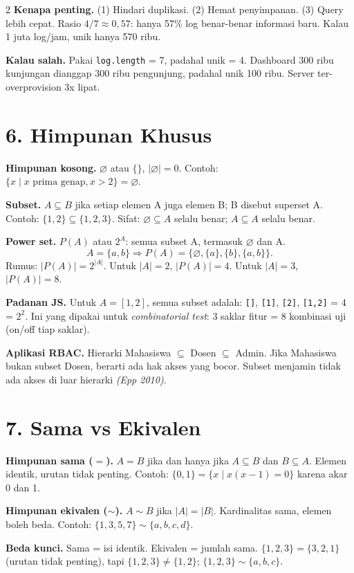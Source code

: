 \documentclass[9pt,a4paper]{extarticle}
\newcommand{\h}[1]{\textbf{#1}}
\newcommand{\src}[1]{\textit{(#1)}}
\begin{document}
\begin{multicols*}{2}
	\h{Kenapa penting.} (1) Hindari duplikasi. (2) Hemat penyimpanan. (3) Query lebih cepat. Rasio $4/7\approx0{,}57$: hanya 57\% log benar-benar informasi baru. Kalau 1 juta log/jam, unik hanya 570 ribu.

	\h{Kalau salah.} Pakai \texttt{log.length} = 7, padahal unik = 4. Dashboard 300 ribu kunjungan dianggap 300 ribu pengunjung, padahal unik 100 ribu. Server ter-overprovision 3x lipat.

	\section*{6. Himpunan Khusus}

	\h{Himpunan kosong.} $\varnothing$ atau $\{\}$, $|\varnothing|=0$. Contoh: $\{x\mid x \text{ prima genap}, x>2\}=\varnothing$.

	\h{Subset.} $A\subseteq B$ jika setiap elemen A juga elemen B; B disebut superset A. Contoh: $\{1,2\}\subseteq\{1,2,3\}$. Sifat: $\varnothing\subseteq A$ selalu benar; $A\subseteq A$ selalu benar.

	\h{Power set.} $P(A)$ atau $2^A$: semua subset A, termasuk $\varnothing$ dan A.
	$$A=\{a,b\}\Rightarrow P(A)=\{\varnothing,\{a\},\{b\},\{a,b\}\}.$$
	Rumus: $|P(A)|=2^{|A|}$. Untuk $|A|=2$, $|P(A)|=4$. Untuk $|A|=3$, $|P(A)|=8$.

	\h{Padanan JS.} Untuk $A=[1,2]$, semua subset adalah: \texttt{[]}, \texttt{[1]}, \texttt{[2]}, \texttt{[1,2]} = 4 = $2^2$. Ini yang dipakai untuk \textit{combinatorial test}: 3 saklar fitur = 8 kombinasi uji (on/off tiap saklar).

	\h{Aplikasi RBAC.} Hierarki Mahasiswa $\subseteq$ Dosen $\subseteq$ Admin. Jika Mahasiswa bukan subset Dosen, berarti ada hak akses yang bocor. Subset menjamin tidak ada akses di luar hierarki \src{Epp 2010}.

	\section*{7. Sama vs Ekivalen}

	\h{Himpunan sama ($=$).} $A=B$ jika dan hanya jika $A\subseteq B$ dan $B\subseteq A$. Elemen identik, urutan tidak penting. Contoh: $\{0,1\}=\{x\mid x(x-1)=0\}$ karena akar 0 dan 1.

	\h{Himpunan ekivalen ($\sim$).} $A\sim B$ jika $|A|=|B|$. Kardinalitas sama, elemen boleh beda. Contoh: $\{1,3,5,7\}\sim\{a,b,c,d\}$.

	\h{Beda kunci.} Sama = isi identik. Ekivalen = jumlah sama. $\{1,2,3\}=\{3,2,1\}$ (urutan tidak penting), tapi $\{1,2,3\}\ne\{1,2\}$; $\{1,2,3\}\sim\{a,b,c\}$.


\end{multicols*}
\end{document}
